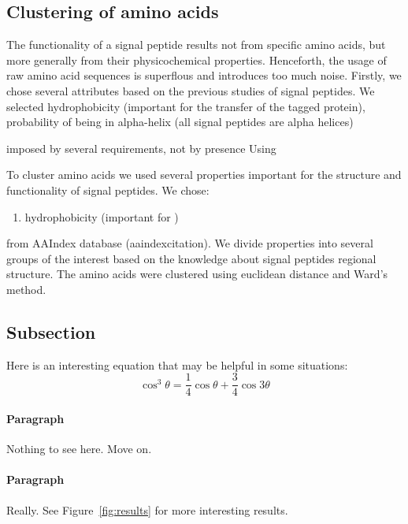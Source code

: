 \documentclass[fleqn,10pt,twoside]{gcb15submission}
\begin{document}
\subsection*{Clustering of amino acids}

The functionality of a signal peptide results not from specific amino acids, but more generally from their physicochemical properties. Henceforth, the usage of raw amino acid sequences is superflous and introduces too much noise. Firstly, we chose several attributes based on the previous studies of signal peptides. We selected hydrophobicity (important for the transfer of the tagged protein), probability of being in alpha-helix (all signal peptides are alpha helices)

imposed by several  requirements, not by presence Using 

To cluster amino acids we used several properties important for the structure and functionality of signal peptides. We chose:
\begin{enumerate}[noitemsep] 
\item hydrophobicity (important for )
\end{enumerate}

from AAIndex database (aaindexcitation). We divide properties into several groups of the interest based on the knowledge about signal peptides regional structure. The amino acids were clustered using euclidean distance and Ward's method.


\subsection*{Subsection}

Here is an interesting equation that may be helpful in some situations:
\begin{equation}
\cos^3 \theta =\frac{1}{4}\cos\theta+\frac{3}{4}\cos 3\theta
\label{eq:refname2}
\end{equation}

\paragraph{Paragraph}
Nothing to see here. Move on.

\paragraph{Paragraph}
Really.
See Figure~\ref{fig:results} for more interesting results.
\end{document}
